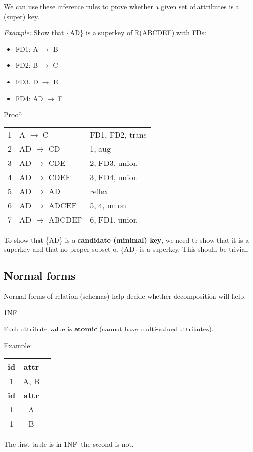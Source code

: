 We can use these inference rules to prove whether a given set of attributes is a (super) key.

\textit{Example: } Show that \{AD\} is a superkey of R(ABCDEF) with FDs:
\begin{itemize}
    \item FD1: A $\to$ B
    \item FD2: B $\to$ C
    \item FD3: D $\to$ E
    \item FD4: AD $\to$ F
\end{itemize}

Proof:

\begin{tabular}{l|l|l}
    1 & A $\to$ C       & FD1, FD2, trans \\
    2 & AD $\to$ CD     & 1, aug          \\
    3 & AD $\to$ CDE    & 2, FD3, union   \\
    4 & AD $\to$ CDEF   & 3, FD4, union   \\
    5 & AD $\to$ AD     & reflex          \\
    6 & AD $\to$ ADCEF  & 5, 4, union     \\
    7 & AD $\to$ ABCDEF & 6, FD1, union   \\
\end{tabular}

To show that \{AD\} is a \textbf{candidate (minimal) key}, we need to show that it is a superkey and that no proper subset of \{AD\} is a superkey. This should be trivial.

\subsection{Normal forms}

Normal forms of relation (schemas) help decide whether decomposition will help.

\begin{definition}
    {1NF}

    Each attribute value is \textbf{atomic} (cannot have multi-valued attributes).

    \tcblower

    Example:
    \begin{tabular}{|c|c|c|}
        \hline
        \textbf{id} & \textbf{attr} \\
        \hline
        1           & A, B          \\
        \hline
        \textbf{id} & \textbf{attr} \\
        \hline
        1           & A             \\
        1           & B             \\
        \hline
    \end{tabular}

    The first table is in 1NF, the second is not.

\end{definition}

